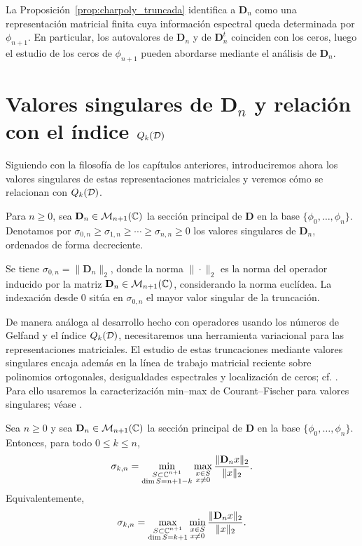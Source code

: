 \begin{rmk}
	La Proposición~\ref{prop:charpoly_truncada} identifica a $\mathbf D_n$ como una representación matricial finita cuya información espectral queda determinada por $\phi_{n+1}$. En particular, los autovalores de $\mathbf D_n$ y de $\mathbf D_n^t$ coinciden con los ceros, luego el estudio de los ceros de $\phi_{n+1}$ pueden abordarse mediante el análisis de $\mathbf D_n$.
\end{rmk}

\section{Valores singulares de \texorpdfstring{$\mathbf D_n$}{Dn} y relación con el índice \texorpdfstring{$Q_k(\mathcal{D})$}{Qk(D)}}

Siguiendo con la filosofía de los capítulos anteriores, introduciremos ahora los valores singulares de estas representaciones matriciales y veremos cómo se relacionan con $Q_k(\mathcal{D})$.

\begin{defn}\label{def:sigma_kn}
	Para $n\ge0$, sea \(\mathbf D_n\in\mathcal M_{n+1}(\mathbb{C})\) la sección principal de \(\mathbf D\) en la base \(\{\phi_0,\dots,\phi_n\}\).
	Denotamos por \(\sigma_{0,n}\ge\sigma_{1,n}\ge\cdots\ge\sigma_{n,n}\ge0\) los valores singulares de \(\mathbf D_n\), ordenados de forma decreciente.
\end{defn}

\begin{rmk}
	Se tiene $\sigma_{0,n}=\|\mathbf D_n\|_2$, donde la norma $\|\cdot\|_2$ es la norma del operador inducido por la matriz $\mathbf D_n \in \mathcal M_{n+1}(\mathbb{C})$, considerando la norma euclídea. La indexación desde $0$ sitúa en $\sigma_{0,n}$ el mayor valor singular de la truncación.
\end{rmk}

De manera análoga al desarrollo hecho con operadores usando los números de Gelfand y el índice $Q_k(\mathcal{D})$, necesitaremos una herramienta variacional para las representaciones matriciales. El estudio de estas truncaciones mediante valores singulares encaja además en la línea de trabajo matricial reciente sobre polinomios ortogonales, desigualdades espectrales y localización de ceros; cf. \cite{EG25-2}. Para ello usaremos la caracterización min--max de Courant--Fischer para valores singulares; véase \cite[Section~3.1]{horn2012matrix}.

\begin{lem}
	\label{lem:minmax_sigma_Dn}
	Sea \(n\ge0\) y sea \(\mathbf D_n\in\mathcal M_{n+1}(\mathbb{C})\) la sección principal de \(\mathbf D\) en la base \(\{\phi_0,\dots,\phi_n\}\). Entonces, para todo \(0\le k\le n\),
	\[
		\sigma_{k,n}
		=
		\min_{\substack{S\subset\mathbb{C}^{n+1}\\ \dim S=n+1-k}}
		\max_{\substack{x\in S\\ x\neq0}}
		\frac{\|\mathbf D_nx\|_2}{\|x\|_2}.
	\]
	Equivalentemente,
	\[
		\sigma_{k,n}
		=
		\max_{\substack{S\subset\mathbb{C}^{n+1}\\ \dim S=k+1}}
		\min_{\substack{x\in S\\ x\neq0}}
		\frac{\|\mathbf D_nx\|_2}{\|x\|_2}.
	\]
\end{lem}

